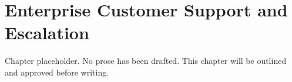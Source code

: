 \chapter{Enterprise Customer Support and Escalation}
\begin{notebox}
Chapter placeholder. No prose has been drafted. This chapter will be outlined and approved before writing.
\end{notebox}
